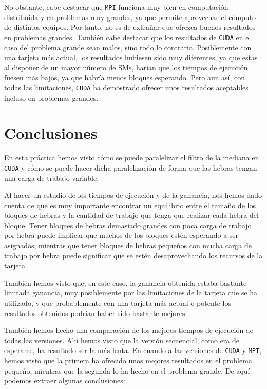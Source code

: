 \documentclass[11pt,a4paper]{article}
\begin{document}
No obstante, cabe destacar que \texttt{MPI} funciona muy bien en computación distribuida y
en problemas muy grandes, ya que permite aprovechar el cómputo de distintos equipos. Por tanto,
no es de extrañar que ofrezca buenos resultados en problemas grandes. También cabe destacar
que los resultados de \texttt{CUDA} en el caso del problema grande sean malos, sino todo lo
contrario. Posiblemente con una tarjeta más actual, los resultados hubiesen sido muy diferentes,
ya que estas al disponer de un mayor número de SMs, harían que los tiempos de ejecución fuesen
más bajos, ya que habría menos bloques esperando. Pero aun así, con todas las limitaciones,
\texttt{CUDA} ha demostrado ofrecer unos resultados aceptables incluso en problemas
grandes.

\section{Conclusiones}

En esta práctica hemos visto cómo se puede paralelizar el filtro de la mediana
en \texttt{CUDA} y cómo se puede hacer dicha paralelización de forma que las hebras
tengan una carga de trabajo variable.

Al hacer un estudio de los tiempos de ejecución y de la ganancia, nos hemos dado cuenta de
que es muy importante encontrar un equilibrio entre el tamaño de los bloques de hebras y la
cantidad de trabajo que tenga que realizar cada hebra del bloque. Tener bloques de hebras
demasiado grandes con poca carga de trabajo por hebra puede implicar que muchos de los bloques
estén esperando a ser asignados, mientras que tener bloques de hebras pequeños con mucha carga
de trabajo por hebra puede significar que se estén desaprovechando los recursos de la tarjeta.

También hemos visto que, en este caso, la ganancia obtenida estaba bastante limitada ganancia,
muy posiblemente por las limitaciones de la tarjeta que se ha utilizado, y que probablemente
con una tarjeta más actual o potente los resultados obtenidos podrían haber sido bastante mejores.

También hemos hecho una comparación de los mejores tiempos de ejecución de todas las versiones.
Ahí hemos visto que la versión secuencial, como era de esperarse, ha resultado ser la más lenta.
En cuando a las versiones de \texttt{CUDA} y \texttt{MPI}, hemos visto que la primera ha ofrecido
unos mejores resultados en el problema pequeño, mientras que la segunda lo ha hecho en el
problema grande. De aquí podemos extraer algunas conclusiones:
\end{document}
